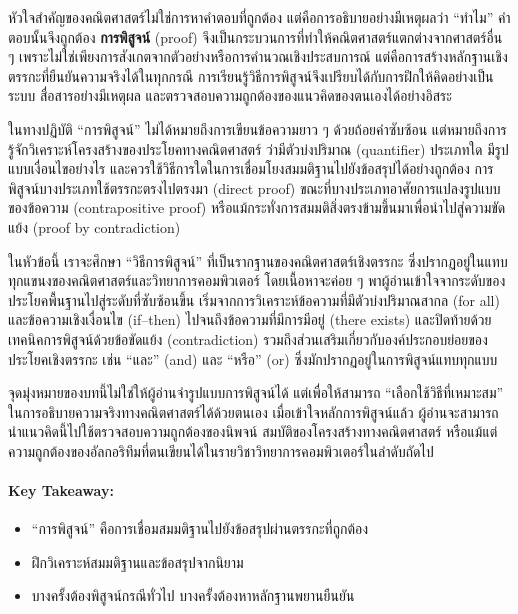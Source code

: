 หัวใจสำคัญของคณิตศาสตร์ไม่ใช่การหาคำตอบที่ถูกต้อง แต่คือการอธิบายอย่างมีเหตุผลว่า “ทำไม” คำตอบนั้นจึงถูกต้อง \textbf{การพิสูจน์} (proof) จึงเป็นกระบวนการที่ทำให้คณิตศาสตร์แตกต่างจากศาสตร์อื่น ๆ เพราะไม่ใช่เพียงการสังเกตจากตัวอย่างหรือการคำนวณเชิงประสบการณ์ แต่คือการสร้างหลักฐานเชิงตรรกะที่ยืนยันความจริงได้ในทุกกรณี การเรียนรู้วิธีการพิสูจน์จึงเปรียบได้กับการฝึกให้คิดอย่างเป็นระบบ สื่อสารอย่างมีเหตุผล และตรวจสอบความถูกต้องของแนวคิดของตนเองได้อย่างอิสระ

ในทางปฏิบัติ “การพิสูจน์” ไม่ได้หมายถึงการเขียนข้อความยาว ๆ ด้วยถ้อยคำซับซ้อน แต่หมายถึงการรู้จักวิเคราะห์โครงสร้างของประโยคทางคณิตศาสตร์ ว่ามีตัวบ่งปริมาณ (quantifier) ประเภทใด มีรูปแบบเงื่อนไขอย่างไร และควรใช้วิธีการใดในการเชื่อมโยงสมมติฐานไปยังข้อสรุปได้อย่างถูกต้อง การพิสูจน์บางประเภทใช้ตรรกะตรงไปตรงมา (direct proof) ขณะที่บางประเภทอาศัยการแปลงรูปแบบของข้อความ (contrapositive proof) หรือแม้กระทั่งการสมมติสิ่งตรงข้ามขึ้นมาเพื่อนำไปสู่ความขัดแย้ง (proof by contradiction)  

ในหัวข้อนี้ เราจะศึกษา “วิธีการพิสูจน์” ที่เป็นรากฐานของคณิตศาสตร์เชิงตรรกะ ซึ่งปรากฏอยู่ในแทบทุกแขนงของคณิตศาสตร์และวิทยาการคอมพิวเตอร์ โดยเนื้อหาจะค่อย ๆ พาผู้อ่านเข้าใจจากระดับของประโยคพื้นฐานไปสู่ระดับที่ซับซ้อนขึ้น เริ่มจากการวิเคราะห์ข้อความที่มีตัวบ่งปริมาณสากล (for all) และข้อความเชิงเงื่อนไข (if–then) ไปจนถึงข้อความที่มีการมีอยู่ (there exists) และปิดท้ายด้วยเทคนิคการพิสูจน์ด้วยข้อขัดแย้ง (contradiction) รวมถึงส่วนเสริมเกี่ยวกับองค์ประกอบย่อยของประโยคเชิงตรรกะ เช่น “และ” (and) และ “หรือ” (or) ซึ่งมักปรากฏอยู่ในการพิสูจน์แทบทุกแบบ

จุดมุ่งหมายของบทนี้ไม่ใช่ให้ผู้อ่านจำรูปแบบการพิสูจน์ได้ แต่เพื่อให้สามารถ “เลือกใช้วิธีที่เหมาะสม” ในการอธิบายความจริงทางคณิตศาสตร์ได้ด้วยตนเอง เมื่อเข้าใจหลักการพิสูจน์แล้ว ผู้อ่านจะสามารถนำแนวคิดนี้ไปใช้ตรวจสอบความถูกต้องของนิพจน์ สมบัติของโครงสร้างทางคณิตศาสตร์ หรือแม้แต่ความถูกต้องของอัลกอริทึมที่ตนเขียนได้ในรายวิชาวิทยาการคอมพิวเตอร์ในลำดับถัดไป

\paragraph*{Key Takeaway:}
\begin{itemize}
	\item “การพิสูจน์” คือการเชื่อมสมมติฐานไปยังข้อสรุปผ่านตรรกะที่ถูกต้อง
	\item ฝึกวิเคราะห์สมมติฐานและข้อสรุปจากนิยาม
	\item บางครั้งต้องพิสูจน์กรณีทั่วไป บางครั้งต้องหาหลักฐานพยานยืนยัน
\end{itemize}
